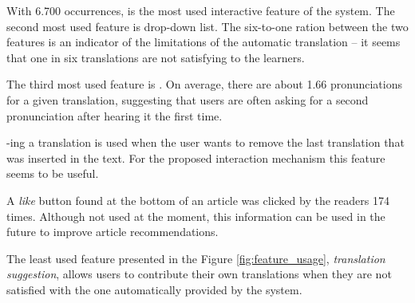 With 6.700 occurrences,  is the most used interactive feature of the system. The second most used feature is  drop-down list. The six-to-one ration between the two features is an indicator of the limitations of the automatic translation -- it seems that one in six translations are not satisfying to the learners.

The third most used feature is . On average, there are about 1.66 pronunciations for a given translation, suggesting that users are often asking for a second pronunciation after hearing it the first time. 




-ing a translation is used when the user wants to remove the last translation that was inserted in the text. For the proposed interaction mechanism this feature seems to be useful. 

A {\em like} button found at the bottom of an article  was clicked by the readers 174 times. Although not used at the moment, this information can be used in the future to improve article recommendations.

The least used feature presented in the Figure \ref{fig:feature_usage}, {\em translation suggestion}, allows users to contribute their own translations when they are not satisfied with the one automatically provided by the system. 

